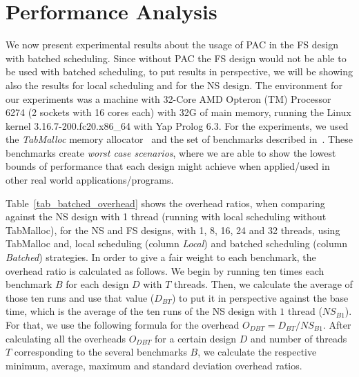 \documentclass{llncs}
\begin{document}

\section{Performance Analysis}

We now present experimental results about the usage of PAC in the FS
design with batched scheduling. Since without PAC the FS design would
not be able to be used with batched scheduling, to put results in
perspective, we will be showing also the results for local scheduling
and for the NS design. The environment for our experiments was a
machine with 32-Core AMD Opteron (TM) Processor 6274 (2 sockets with
16 cores each) with 32G of main memory, running the Linux kernel
3.16.7-200.fc20.x86\_64 with Yap Prolog 6.3. For the experiments, we
used the \emph{TabMalloc} memory allocator~\cite{Areias-12b} and the
set of benchmarks described in~\cite{Areias-12b}. These benchmarks
create \emph{worst case scenarios}, where we are able to show the
lowest bounds of performance that each design might achieve when
applied/used in other real world applications/programs.

Table~\ref{tab_batched_overhead} shows the overhead ratios, when
comparing against the NS design with 1 thread (running with local
scheduling without TabMalloc), for the NS and FS designs, with 1, 8,
16, 24 and 32 threads, using TabMalloc and, local scheduling (column
\emph{Local}) and batched scheduling (column \emph{Batched})
strategies. In order to give a fair weight to each benchmark, the
overhead ratio is calculated as follows. We begin by running ten times
each benchmark $B$ for each design $D$ with $T$ threads. Then, we
calculate the average of those ten runs and use that value ($D_{BT}$)
to put it in perspective against the base time, which is the average
of the ten runs of the NS design with $1$ thread ($NS_{B1}$). For
that, we use the following formula for the overhead $O_{DBT} = D_{BT}
/ NS_{B1}$. After calculating all the overheads $O_{DBT}$ for a
certain design $D$ and number of threads $T$ corresponding to the
several benchmarks $B$, we calculate the respective minimum, average,
maximum and standard deviation overhead ratios.
\end{document}
